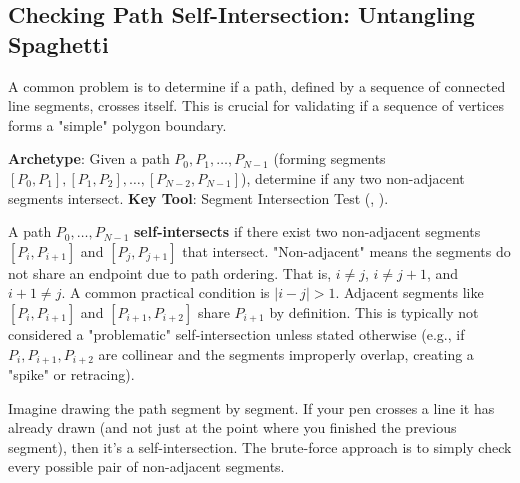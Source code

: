 \subsection{Checking Path Self-Intersection: Untangling Spaghetti}
\label{ssec:A.4.3}

A common problem is to determine if a path, defined by a sequence of connected line segments, crosses itself. This is crucial for validating if a sequence of vertices forms a "simple" polygon boundary.

\begin{pattern}
\label{pattern:A.4.3.self_intersection}
\textbf{Archetype}: Given a path $P_0, P_1, \ldots, P_{N-1}$ (forming segments $[P_0,P_1], [P_1,P_2], \ldots, [P_{N-2},P_{N-1}]$), determine if any two non-adjacent segments intersect.
\textbf{Key Tool}: Segment Intersection Test (, ).
\end{pattern}

\begin{definition}
\label{def:A.4.3.path_self_intersection}
A path $P_0, \ldots, P_{N-1}$ \textbf{self-intersects} if there exist two non-adjacent segments $[P_i, P_{i+1}]$ and $[P_j, P_{j+1}]$ that intersect.
"Non-adjacent" means the segments do not share an endpoint due to path ordering. That is, $i \neq j$, $i \neq j+1$, and $i+1 \neq j$. A common practical condition is $|i-j| > 1$.
Adjacent segments like $[P_i, P_{i+1}]$ and $[P_{i+1}, P_{i+2}]$ share $P_{i+1}$ by definition. This is typically not considered a "problematic" self-intersection unless stated otherwise (e.g., if $P_i, P_{i+1}, P_{i+2}$ are collinear and the segments improperly overlap, creating a "spike" or retracing).
\end{definition}

\begin{intuition}
\label{intuition:A.4.3.path_self_intersection}
Imagine drawing the path segment by segment. If your pen crosses a line it has already drawn (and not just at the point where you finished the previous segment), then it's a self-intersection.
The brute-force approach is to simply check every possible pair of non-adjacent segments.
\end{intuition}

